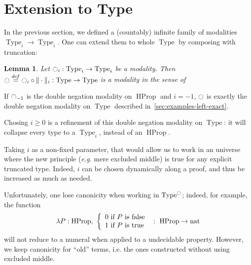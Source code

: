 \documentclass[preprint,9pt,numbers]{sigplanconf}
\newtheorem{lem}[thm]{Lemma}
\newcommand \defeq {\overset{de\hspace{-0.2ex}f}{=}}
\newcommand{\mynote}[2]{
    \fbox{\bfseries\sffamily\scriptsize#1}
    {\small$\blacktriangleright$\textsf{\emph{#2}}$\blacktriangleleft$}~}
\newcommand\nt[1]{\mynote{NT}{#1}}
\DeclareMathOperator{\Type}{Type}
\DeclareMathOperator{\HProp}{HProp}
\DeclareMathOperator{\nat}{nat}
\newcommand{\modal}{\ensuremath{\ocircle}}
\newenvironment{mymath}[1][-0em]{%
  \newcommand\mymathaux{\vspace{#1}}%
  \vspace{#1}%
  \begin{equation*}%
  }{ %
    \mymathaux%
  \end{equation*}}
\begin{document}

\section{Extension to Type}
\label{sec:extension-type}

In the previous section, we defined a (countably) infinite family of
modalities $\Type_i \to \Type_i$. One can extend them to whole
$\Type$ by composing with truncation:

\begin{lem}\label{lem:type}
  Let $\modal_i:\Type_i \to \Type_i$ be a modality. Then $\modal
  \defeq \modal_i
  \circ \|\cdot\|_i : \Type \to \Type$ is a modality in the sense
  of~\cite[Section 7.7]{hottbook}
\end{lem}

If $\modal_{-1}$ is the double negation modality on $\HProp$ and
$i=-1$, $\modal$ is exactly the double negation modality on $\Type$
described in~\ref{sec:examples-left-exact}.

Chosing $i\geqslant 0$ is a refinement of this double negation
modality on $\Type$: it will collapse every type to a $\Type_i$,
instead of an $\HProp$.

Taking $i$ as a non-fixed parameter, that would allow us to work in an
universe where the new principle ({\em e.g.} mere excluded middle) is
true for any explicit truncated type. Indeed, $i$ can be chosen
dynamically along a proof, and thus be increased as much as needed.

Unfortunately, one lose canonicity when working in $\Type^\modal$;
indeed, for example, the function 
\begin{mymath}\lambda P:\HProp,~\left\{\begin{array}{l} 0 \text{ if $P$ is
                                    false} \\ 1 \text{ if $P$ is
                                    true} \end{array}\right.~:~\HProp
                              \to \nat\end{mymath}%
will not reduce to a numeral when applied to a undecidable
property. However, we keep canonicity for ``old'' terms, i.e. the
ones constructed without using excluded middle.
\end{document}
